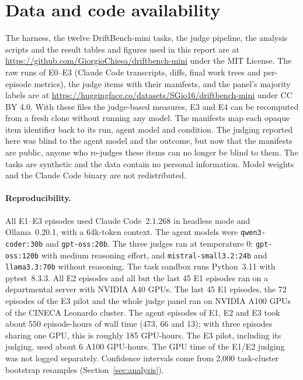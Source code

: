 \section*{Data and code availability}
\label{sec:availability}

The harness, the twelve DriftBench-mini tasks, the judge pipeline, the analysis scripts and the
result tables and figures used in this report are at
\url{https://github.com/GiorgioChiesa/driftbench-mini} under the MIT License. The raw runs of
E0--E3 (Claude Code transcripts, diffs, final work trees and per-episode metrics), the judge items
with their manifests, and the panel's majority labels are at
\url{https://huggingface.co/datasets/SGio16/driftbench-mini} under CC BY 4.0. With these files the
judge-based measures, E3 and E4 can be recomputed from a fresh clone without running any model. The
manifests map each opaque item identifier back to its run, agent model and condition. The judging
reported here was blind to the agent model and the outcome, but now that the manifests are public,
anyone who re-judges these items can no longer be blind to them. The tasks are synthetic and the
data contain no personal information. Model weights and the Claude Code binary are not
redistributed.

\paragraph{Reproducibility.} All E1--E3 episodes used Claude Code~2.1.268 in headless mode and Ollama~0.20.1,
with a 64k-token context. The agent models were \texttt{qwen3-coder:30b} and \texttt{gpt-oss:20b}.
The three judges ran at temperature 0: \texttt{gpt-oss:120b} with medium reasoning effort, and
\texttt{mistral-small3.2:24b} and \texttt{llama3.3:70b} without reasoning. The task sandbox runs Python~3.11 with
pytest~8.3.3. All E2 episodes and all but the last 45 E1 episodes ran on a departmental server with
NVIDIA A40 GPUs. The last 45 E1 episodes, the 72 episodes of the E3 pilot and the whole judge panel
ran on NVIDIA A100 GPUs of the CINECA Leonardo cluster. The agent episodes of E1, E2 and E3 took
about 550 episode-hours of wall time (473, 66 and 13); with three episodes sharing one GPU, this is
roughly 185 GPU-hours. The E3 pilot, including its judging, used about 6 A100 GPU-hours. The GPU
time of the E1/E2 judging was not logged separately. Confidence intervals come from 2{,}000
task-cluster bootstrap resamples (Section~\ref{sec:analysis}).
